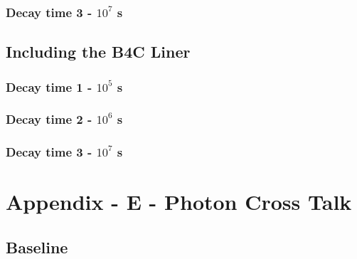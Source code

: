 \documentclass[12pt]{article}
\begin{document}
\subsubsection{Decay time 3 - $10^7$ s}

\clearpage
\subsection{Including the B4C Liner}
\subsubsection{Decay time 1 - $10^5$ s}

\clearpage
\subsubsection{Decay time 2 - $10^6$ s}

\clearpage
\subsubsection{Decay time 3 - $10^7$ s}


\newpage
\clearpage
\section{Appendix - E - Photon Cross Talk}
\subsection{Baseline}
\end{document}
